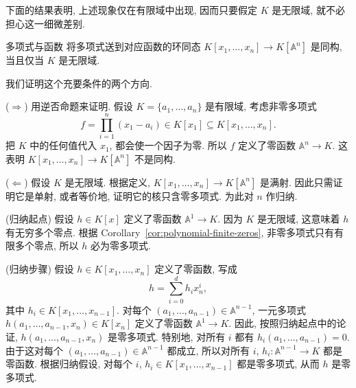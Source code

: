 下面的结果表明, 上述现象仅在有限域中出现, 因而只要假定 $K$ 是无限域, 就不必担心这一细微差别.

\begin{Proposition}{多项式与函数}\leavevmode\label{prop:polynomial-function-isomorphism}
  将多项式送到对应函数的环同态 $K[x_{1},\ldots,x_{n}]\to K[\mathbb{A}^{n}]$ 是同构, 当且仅当 $K$ 是无限域.
\end{Proposition}

\begin{Proof}
  我们证明这个充要条件的两个方向.

  ($\Rightarrow$) 用逆否命题来证明. 假设 $K=\{a_{1},\ldots,a_{n}\}$ 是有限域, 考虑非零多项式
  \[
    f=\prod_{i=1}^{n}(x_{1}-a_{i})\in K[x_{1}]\subseteq K[x_{1},\ldots,x_{n}].
  \]
  把 $K$ 中的任何值代入 $x_{1}$, 都会使一个因子为零. 所以 $f$ 定义了零函数 $\mathbb{A}^{n}\to K$. 这表明 $K[x_{1},\ldots,x_{n}]\to K[\mathbb{A}^{n}]$ 不是同构.

  ($\Leftarrow$) 假设 $K$ 是无限域. 根据定义, $K[x_{1},\ldots,x_{n}]\to K[\mathbb{A}^{n}]$ 是满射. 因此只需证明它是单射, 或者等价地, 证明它的核只含零多项式. 为此对 $n$ 作归纳.

  (归纳起点) 假设 $h\in K[x]$ 定义了零函数 $\mathbb{A}^{1}\to K$. 因为 $K$ 是无限域, 这意味着 $h$ 有无穷多个零点. 根据 Corollary~\ref{cor:polynomial-finite-zeros}, 非零多项式只有有限多个零点, 所以 $h$ 必为零多项式.

  (归纳步骤) 假设 $h\in K[x_{1},\ldots,x_{n}]$ 定义了零函数, 写成
  \[
    h=\sum_{i=0}^{d}h_{i}x_{n}^{i},
  \]
  其中 $h_{i}\in K[x_{1},\ldots,x_{n-1}]$. 对每个 $(a_{1},\ldots,a_{n-1})\in\mathbb{A}^{n-1}$, 一元多项式 $h(a_{1},\ldots,a_{n-1},x_{n})\in K[x_{n}]$ 定义了零函数 $\mathbb{A}^{1}\to K$. 因此, 按照归纳起点中的论证, $h(a_{1},\ldots,a_{n-1},x_{n})$ 是零多项式. 特别地, 对所有 $i$ 都有 $h_{i}(a_{1},\ldots,a_{n-1})=0$. 由于这对每个 $(a_{1},\ldots,a_{n-1})\in\mathbb{A}^{n-1}$ 都成立, 所以对所有 $i$, $h_{i}:\mathbb{A}^{n-1}\to K$ 都是零函数. 根据归纳假设, 对每个 $i$, $h_{i}\in K[x_{1},\ldots,x_{n-1}]$ 都是零多项式, 从而 $h$ 是零多项式.
\end{Proof}

